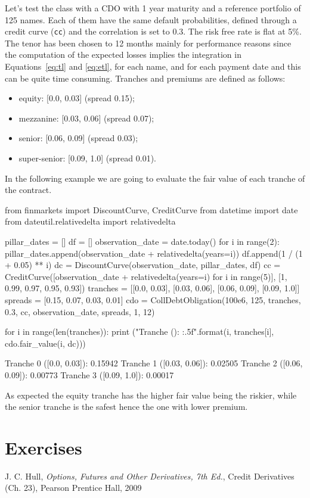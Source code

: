 Let's test the class with a CDO with 1 year maturity and a reference portfolio of 125 names. Each of them have the same default probabilities, defined through a credit curve (\texttt{cc}) and the correlation is set to 0.3. The risk free rate is flat at 5\%. The tenor has been chosen to 12 months mainly for performance reasons since the computation of the expected losses implies the integration in Equations~\ref{eq:tl} and \ref{eq:etl}, for each name, and for each payment date and this can be quite time consuming.
Tranches and premiums are defined as follows:
\begin{itemize}
	\item equity: [0.0, 0.03] (spread 0.15);
	\item mezzanine: [0.03, 0.06] (spread 0.07);
	\item senior: [0.06, 0.09] (spread 0.03);
	\item super-senior: [0.09, 1.0] (spread 0.01).
\end{itemize}

In the following example we are going to evaluate the fair value of each tranche of the contract.

\begin{ipython}
from finmarkets import DiscountCurve, CreditCurve
from datetime import date
from dateutil.relativedelta import relativedelta

pillar_dates = []
df = []
observation_date = date.today()
for i in range(2):
    pillar_dates.append(observation_date + relativedelta(years=i))
    df.append(1 / (1 + 0.05) ** i)
dc = DiscountCurve(observation_date, pillar_dates, df)
cc = CreditCurve([observation_date + relativedelta(years=i) for i in range(5)],
                 [1, 0.99, 0.97, 0.95, 0.93])
tranches = [[0.0, 0.03], [0.03, 0.06], [0.06, 0.09], [0.09, 1.0]]
spreads = [0.15, 0.07, 0.03, 0.01]
cdo = CollDebtObligation(100e6, 125, tranches, 0.3, cc,
                         observation_date, spreads, 1, 12)
          
for i in range(len(tranches)):
    print ("Tranche {} ({}): {:.5f}".format(i, tranches[i], cdo.fair_value(i, dc)))
\end{ipython}
\begin{ioutput}
Tranche 0 ([0.0, 0.03]): 0.15942
Tranche 1 ([0.03, 0.06]): 0.02505
Tranche 2 ([0.06, 0.09]): 0.00773
Tranche 3 ([0.09, 1.0]): 0.00017
\end{ioutput}

As expected the equity tranche has the higher fair value being the riskier, while the senior tranche is the safest hence the one with lower premium.

\section*{Exercises}


\begin{thebibliography}{9}
 J. C. Hull, \emph{Options, Futures and Other Derivatives, 7th Ed.}, Credit Derivatives (Ch. 23), Pearson Prentice Hall, 2009
\end{thebibliography}
